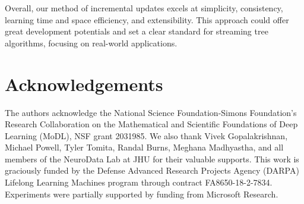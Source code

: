 Overall, our method of incremental updates excels at simplicity, consistency, learning time and space efficiency, and extensibility. This approach could offer great development potentials and set a clear standard for streaming tree algorithms, focusing on real-world applications.

\section*{Acknowledgements}
The authors acknowledge the National Science Foundation-Simons Foundation’s Research Collaboration on the Mathematical and Scientific Foundations of Deep Learning (MoDL), NSF grant 2031985. We also thank Vivek Gopalakrishnan, Michael Powell, Tyler Tomita, Randal Burns, Meghana Madhyastha, and all members of the NeuroData Lab at JHU for their valuable supports. This work is graciously funded by the Defense Advanced Research Projects Agency (DARPA) Lifelong Learning Machines program through contract FA8650-18-2-7834. Experiments were partially supported by funding from Microsoft Research.